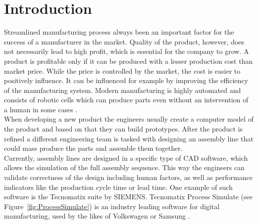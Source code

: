 \chapter{Introduction}
\label{ch:introduction}
\graphicspath{ {chapters/Introduction/} }

Streamlined manufacturing process always been an important factor for the success of a manufacturer in the market. 
Quality of the product, however, does not necessarily lead to high profit, which is essential for the company to grow. 
A product is profitable only if it can be produced with a lesser production cost than market price. 
While the price is controlled by the market, the cost is easier to positively influence.
It can be influenced for example by improving the efficiency of the manufacturing system. 
Modern manufacturing is highly automated and consists of robotic cells which can produce parts even without an intervention of a human in some cases \cite{VirtualCommisioning}. \\

When developing a new product the engineers usually create a computer model of the product and based on that they can build prototypes. After the product is refined a different engineering team is tasked with designing an assembly line that could mass produce the parts and assemble them together. \\
 
Currently, assembly lines are designed in a specific type of CAD software, which allows the simulation of the full assembly sequence.
This way the engineers can validate correctness of the design including human factors, as well as performance indicators like the production cycle time or lead time.
One example of such software is the Tecnomatix suite by SIEMENS. Tecnomatix Process Simulate (see Figure~\ref{fig:ProcessSimulate}) is an industry leading software for digital manufacturing, used by the likes of Volkswagen or Samsung \cite{TecnomatixCustomers}. \\ 

